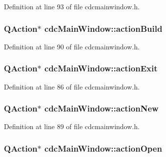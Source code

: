 Definition at line 93 of file cdcmainwindow.\+h.

\hypertarget{classcdc_main_window_a2eda25173588377e053709151eedb45b}{
\subsubsection[{action\+Build}]{\setlength{\rightskip}{0pt plus 5cm}Q\+Action$\ast$ cdc\+Main\+Window\+::action\+Build\hspace{0.3cm}{\ttfamily [private]}}}\label{classcdc_main_window_a2eda25173588377e053709151eedb45b}


Definition at line 90 of file cdcmainwindow.\+h.

\hypertarget{classcdc_main_window_a31bfc3ddbac31b5a2b98871fefd97bee}{
\subsubsection[{action\+Exit}]{\setlength{\rightskip}{0pt plus 5cm}Q\+Action$\ast$ cdc\+Main\+Window\+::action\+Exit\hspace{0.3cm}{\ttfamily [private]}}}\label{classcdc_main_window_a31bfc3ddbac31b5a2b98871fefd97bee}


Definition at line 86 of file cdcmainwindow.\+h.

\hypertarget{classcdc_main_window_a7e1acb848a40fdf54379bfb5225cf444}{
\subsubsection[{action\+New}]{\setlength{\rightskip}{0pt plus 5cm}Q\+Action$\ast$ cdc\+Main\+Window\+::action\+New\hspace{0.3cm}{\ttfamily [private]}}}\label{classcdc_main_window_a7e1acb848a40fdf54379bfb5225cf444}


Definition at line 89 of file cdcmainwindow.\+h.

\hypertarget{classcdc_main_window_acaec69cb2e1bcea186dbad417d0d354c}{
\subsubsection[{action\+Open}]{\setlength{\rightskip}{0pt plus 5cm}Q\+Action$\ast$ cdc\+Main\+Window\+::action\+Open\hspace{0.3cm}{\ttfamily [private]}}}\label{classcdc_main_window_acaec69cb2e1bcea186dbad417d0d354c}


